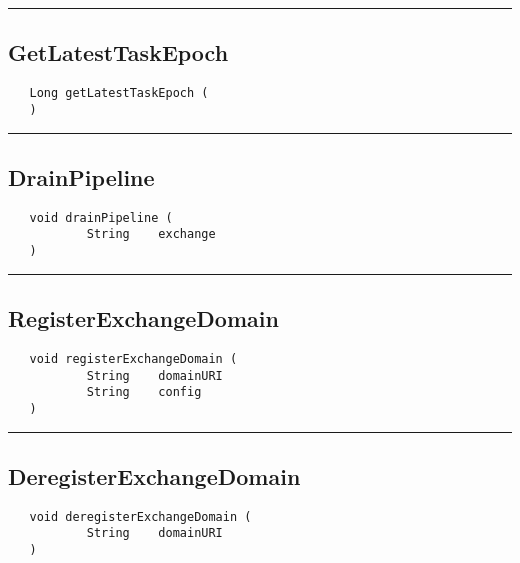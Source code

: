 \rule{15cm}{2pt}
\subsection{GetLatestTaskEpoch}
\label{Api:GetLatestTaskEpoch}
\begin{verbatim}
   Long getLatestTaskEpoch (
   )
\end{verbatim}



\rule{15cm}{2pt}
\subsection{DrainPipeline}
\label{Api:DrainPipeline}
\begin{verbatim}
   void drainPipeline (
           String    exchange
   )
\end{verbatim}



\rule{15cm}{2pt}
\subsection{RegisterExchangeDomain}
\label{Api:RegisterExchangeDomain}
\begin{verbatim}
   void registerExchangeDomain (
           String    domainURI
           String    config
   )
\end{verbatim}



\rule{15cm}{2pt}
\subsection{DeregisterExchangeDomain}
\label{Api:DeregisterExchangeDomain}
\begin{verbatim}
   void deregisterExchangeDomain (
           String    domainURI
   )
\end{verbatim}



